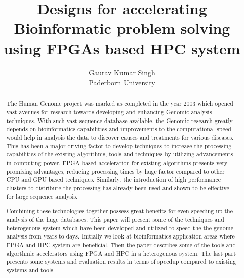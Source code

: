 \documentclass[12pt,twoside]{article}
\newcommand{\participant}{Gaurav Kumar Singh}
\newcommand{\affiliation}{Paderborn University}
\newcommand{\topic}{Designs for accelerating Bioinformatic problem solving using FPGAs based HPC system}
\begin{document}
\title{\topic}
\author{\Large{\participant}\\ \affiliation \\ {\small \emailaddress}}
\date{}
\maketitle
\thispagestyle{empty}


\begin{abstract}

 The Human Genome project was marked as completed in the year 2003 which opened vast avenues 
 for research towards developing and enhancing Genomic analysis techniques. With such vast sequence
 database available, the Genomic research greatly depends on bioinformatics capabilities and improvements
 to the computational speed would help in analysis the data to discover causes and treatments for various
 diseases. This has been a major driving factor to develop techniques to increase the  processing
 capabilities of the  existing algorithms, tools and techniques by utilizing advancements in computing power.
 FPGA based acceleration for existing algorithms presents very promising advantages, reducing processing times
 by huge factor compared to other CPU and GPU based techniques. Similarly, the introduction of high performance
 clusters to distribute the processing has already been used and shown to be effective for large sequence analysis.

 Combining these technologies together possess great benefits for even speeding up the analysis of the huge databases.
 This paper will present some of the techniques and heterogenous system which have been developed and utilized to
 speed the the genome analysis from years to days. Initially we look at bioinformatics application areas where
 FPGA and HPC system are beneficial. Then the paper describes some of the tools and algorthmic accelerators
 using FPGA and HPC in a heterogenous system. The last part presents some systems and evaluation
 results in terms of speedup compared to existing systems and tools.

\end{abstract}

\end{document}
